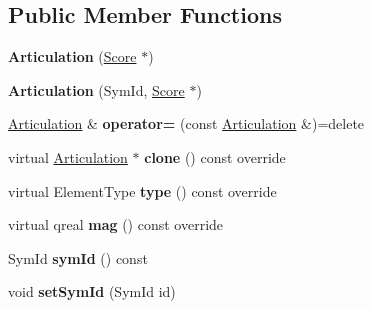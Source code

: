 \subsection*{Public Member Functions}
\begin{DoxyCompactItemize}
\item 
\mbox{\label{class_ms_1_1_articulation_a06d7d1cf32a5b6a62d48a950a26453cc}} 
{\bfseries Articulation} (\hyperlink{class_ms_1_1_score}{Score} $\ast$)
\item 
\mbox{\label{class_ms_1_1_articulation_a2b03563256ac89a62aa2519381927463}} 
{\bfseries Articulation} (Sym\+Id, \hyperlink{class_ms_1_1_score}{Score} $\ast$)
\item 
\mbox{\label{class_ms_1_1_articulation_acabcad3a7a235a1456cee4f98cf894a6}} 
\hyperlink{class_ms_1_1_articulation}{Articulation} \& {\bfseries operator=} (const \hyperlink{class_ms_1_1_articulation}{Articulation} \&)=delete
\item 
\mbox{\label{class_ms_1_1_articulation_ae56332f446ec1d9cc32d195dd8a6003b}} 
virtual \hyperlink{class_ms_1_1_articulation}{Articulation} $\ast$ {\bfseries clone} () const override
\item 
\mbox{\label{class_ms_1_1_articulation_a80c648b805e230d02da4be75bcadf9be}} 
virtual Element\+Type {\bfseries type} () const override
\item 
\mbox{\label{class_ms_1_1_articulation_a57dbf53ff2a6640d5fcab30476dd1165}} 
virtual qreal {\bfseries mag} () const override
\item 
\mbox{\label{class_ms_1_1_articulation_a995f8ed647d2a75582b2f82378a9ff41}} 
Sym\+Id {\bfseries sym\+Id} () const
\item 
\mbox{\label{class_ms_1_1_articulation_a23ba4de4ed4a819a2fbba76822998a3e}} 
void {\bfseries set\+Sym\+Id} (Sym\+Id id)
\item 
\mbox{\label{class_ms_1_1_articulation_a2a5d4ba5d7beae3aeff504a745ab0e09}} 

\end{DoxyCompactItemize}

